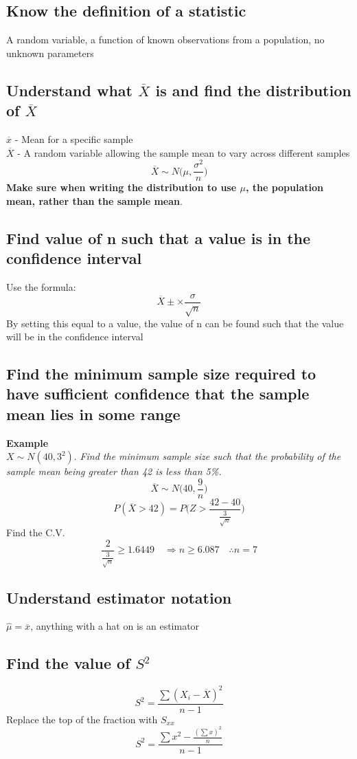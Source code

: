 \documentclass{article}[18pt]
\begin{document}
\subsection{Know the definition of a statistic}
A random variable, a function of known observations from a population, no unknown parameters
\subsection{Understand what $\overline{X}$ is and find the distribution of $\overline{X}$}
$\overline{x}$ - Mean for a specific sample\\
$\overline{X}$  - A random variable allowing the sample mean to vary across different samples
$$\overline{X}\sim N\Bigg(\mu,\frac{\sigma^2}{n}\Bigg)$$
\textbf{Make sure when writing the distribution to use $\mu$, the population mean, rather than the sample mean}.
\subsection{Find value of n such that a value is in the confidence interval}
Use the formula:
$$\overline{X}\pm \times\frac{\sigma}{\sqrt{n}}$$
By setting this equal to a value, the value of n can be found such that the value will be in the confidence interval

\subsection{Find the minimum sample size required to have sufficient confidence that the sample mean lies in some range}
\textbf{Example}\\
$X\sim N(40,3^2)$. \textit{Find the minimum sample size such that the probability of the sample mean being greater than 42 is less than 5\%.}
$$\overline{X}\sim N\Bigg(40,\frac{9}{n}\Bigg)$$
$$P(\overline{X}>42)=P\Bigg(Z>\frac{42-40}{\frac{3}{\sqrt{n}}}\Bigg)$$
Find the C.V.
$$\frac{2}{\frac{3}{\sqrt{n}}}\geqslant1.6449\quad \Rightarrow n\geqslant6.087 \quad \therefore n=7$$
\subsection{Understand estimator notation}
$\hat{\mu}=\overline{x}$, anything with a hat on is an estimator
\subsection{Find the value of $S^2$}
$$S^2=\frac{\sum(X_i-\overline{X})^2}{n-1}$$
Replace the top of the fraction with $S_{xx}$
$$S^2=\frac{\sum x^2-\frac{(\sum x)^2}{n}}{n-1}$$
\end{document}
